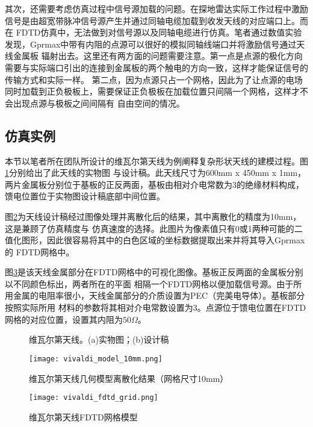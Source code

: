 其次，还需要考虑仿真过程中信号源加载的问题。在探地雷达实际工作过程中激励信号是由超宽带脉冲信号源产生并通过同轴电缆加载到收发天线的对应端口上。而在
FDTD仿真中，无法做到对信号源以及同轴电缆进行仿真。笔者通过数值实验发现，Gprmax中带有内阻的点源可以很好的模拟同轴线端口并将激励信号通过天线金属板
辐射出去。这里还有两方面的问题需要注意。第一点是点源的极化方向需要与实际端口引出的连接到金属板的两个触电的方向一致，这样才能保证信号的传输方式和实际一样。
第二点，因为点源只占一个网格，因此为了让点源的电场同时加载到正负极板上，需要保证正负极板在加载位置只间隔一个网格，这样才不会出现点源与极板之间间隔有
自由空间的情况。

\subsection{仿真实例}
本节以笔者所在团队所设计的维瓦尔第天线为例阐释复杂形状天线的建模过程。图\ref{vivaldi_design}分别给出了此天线的实物图
与设计稿。此天线尺寸为600mm x 450mm x 1mm，两片金属板分别位于基板的正反两面，基板由相对介电常数为3的绝缘材料构成，
馈电位置位于实物图设计稿底部中间位置。

图\ref{vivaldi_model_10mm}为天线设计稿经过图像处理并离散化后的结果，其中离散化的精度为10mm，这是兼顾了仿真精度与
仿真速度的选择。此图片为像素值只有0或1两种可能的二值化图形，因此很容易将其中的白色区域的坐标数据提取出来并将其导入Gprmax的
FDTD网格中。

图\ref{vivaldi_fdtd_grid}是该天线金属部分在FDTD网格中的可视化图像。基板正反两面的金属板分别以不同颜色标出，两者所在的平面
相隔一个FDTD网格以便加载信号源。由于所用金属的电阻率很小，天线金属部分的介质设置为PEC（完美电导体）。基板部分按照实际所用
材料的参数将其相对介电常数设置为3。点源位于馈电位置在FDTD网格的对应位置，设置其内阻为$50\Omega$。
\begin{figure}[htbp]
	\caption[]{维瓦尔第天线。(a)实物图；(b)设计稿}
	\label{vivaldi_design}
\end{figure}

\begin{figure}[htbp]
	\texttt{[image: vivaldi\_model\_10mm.png]}
	\caption[]{维瓦尔第天线几何模型离散化结果（网格尺寸10mm）}
	\label{vivaldi_model_10mm}
\end{figure}

\begin{figure}[htbp]
	\texttt{[image: vivaldi\_fdtd\_grid.png]}
	\caption[]{维瓦尔第天线FDTD网格模型}
	\label{vivaldi_fdtd_grid}
\end{figure}

